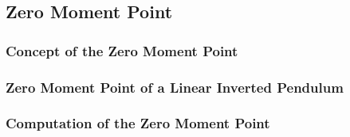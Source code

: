 \subsection{Zero Moment Point}
\label{sec::311_zmp}

\subsubsection{Concept of the Zero Moment Point}
\subsubsection{Zero Moment Point of a Linear Inverted Pendulum}
\subsubsection{Computation of the Zero Moment Point}
